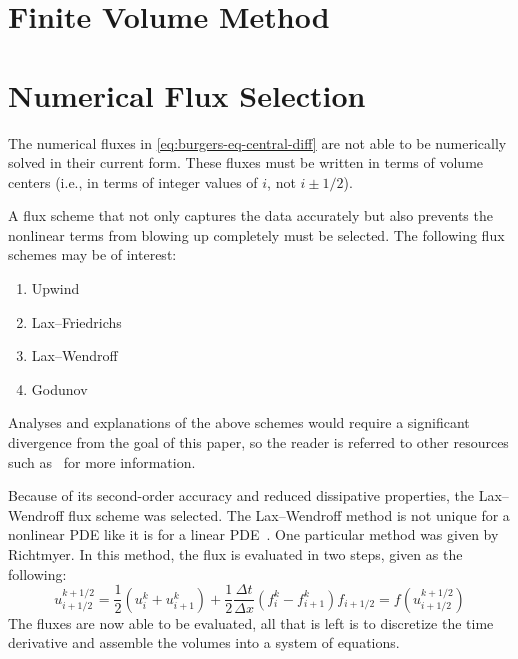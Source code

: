\documentclass[ltr]{ornltm-app-mod} %
\numberwithin{equation}{section}
\begin{document}
    \section{Finite Volume Method}\label{sec:finite-volume-method}
    


    \section{Numerical Flux Selection} \label{sec:numerical-flux-selection}
    The numerical fluxes in \cref{eq:burgers-eq-central-diff} are not able to be numerically solved in their current form.
    These fluxes must be written in terms of volume centers (i.e., in terms of integer values of $i$, not $i\pm 1/2$).

    A flux scheme that not only captures the data accurately but also prevents the nonlinear terms from blowing up completely must be selected.
    The following flux schemes may be of interest:
    \begin{enumerate}
        \item Upwind
        \item Lax--Friedrichs
        \item Lax--Wendroff
        \item Godunov
    \end{enumerate}
    Analyses and explanations of the above schemes would require a significant divergence from the goal of this paper, so the reader is referred to other resources such as~\autocite{alma992854184708136} for more information.

    Because of its second-order accuracy and reduced dissipative properties, the Lax--Wendroff flux scheme was selected.
    The Lax--Wendroff method is not unique for a nonlinear PDE like it is for a linear PDE~\autocite{LaxWendroffMethodEncyclopedia}.
    One particular method was given by Richtmyer.
    In this method, the flux is evaluated in two steps, given as the following:
    \begin{subequations}
        \begin{equation}
            \label{eq:richtmyer-1st-step}
            u_{i+1/2}^{k+1/2}=\frac{1}{2}\left( u_i^k+u_{i+1}^k \right)+\frac{1}{2}\frac{\Delta t}{\Delta x}\left( f_i^k-f_{i+1}^k \right)
        \end{equation}
        \begin{equation}
            \label{eq:richtmyer-2nd-step}
            f_{i+1/2}=f\left( u_{i+1/2}^{k+1/2} \right)
        \end{equation}
    \end{subequations}
    The fluxes are now able to be evaluated, all that is left is to discretize the time derivative and assemble the volumes into a system of equations.
\end{document}
